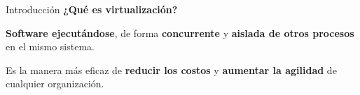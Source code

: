 \begin{frame}{Introducción}
    \vspace{0cm}
    \textbf{¿Qué es virtualización?}
    \begin{block}{}
        \textbf{Software ejecutándose}, de forma \textbf{concurrente} y \textbf{aislada de otros procesos} en el mismo sistema.
    \end{block}
    \begin{block}{}
        Es la manera más eficaz de \textbf{reducir los costos} y \textbf{aumentar la  agilidad} de cualquier organización.
    \end{block}



\end{frame}

